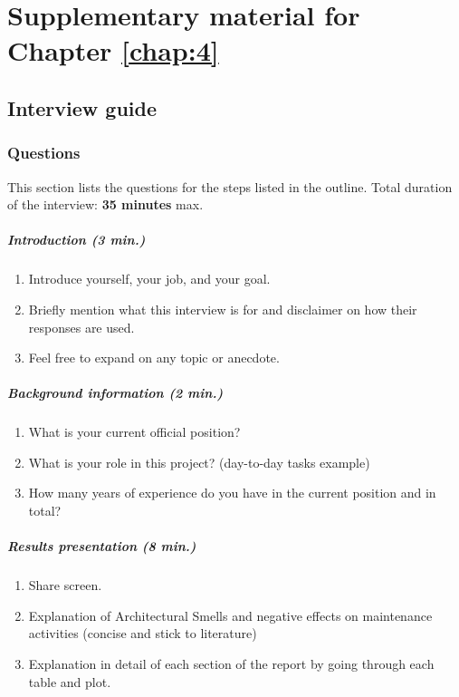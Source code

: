 \chapter{Supplementary material for Chapter \ref{chap:4}}
\section{Interview guide}\label{c4:appendix:interview-guide}
\subsection{Questions}
This section lists the questions for the steps listed in the outline.
Total duration of the interview: \textbf{35 minutes} max.

\paragraph{Introduction (3 min.)}
\begin{enumerate}
    \item Introduce yourself, your job, and your goal.
    \item Briefly mention what this interview is for and disclaimer on how their responses are used.
    \item Feel free to expand on any topic or anecdote.
\end{enumerate}

\paragraph{Background information (2 min.)}
\begin{enumerate}[resume]
    \item What is your current official position?
    \item What is your role in this project? (day-to-day tasks example)
    \item How many years of experience do you have in the current position and in total?
\end{enumerate}

\paragraph{Results presentation (8 min.)}
\begin{enumerate}[resume]
    \item Share screen.
    \item Explanation of Architectural Smells and negative effects on maintenance activities (concise and stick to literature)
    \item Explanation in detail of each section of the report by going through each table and plot.
\end{enumerate}

